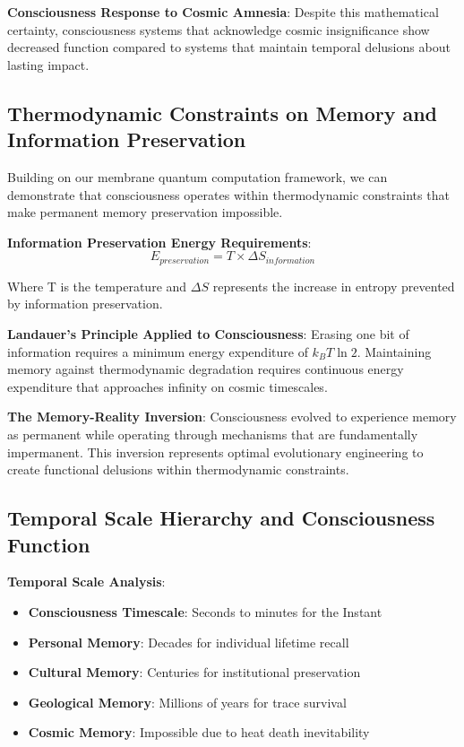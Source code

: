 \documentclass[12pt]{article}
\begin{document}
\textbf{Consciousness Response to Cosmic Amnesia}: Despite this mathematical certainty, consciousness systems that acknowledge cosmic insignificance show decreased function compared to systems that maintain temporal delusions about lasting impact.

\subsection{Thermodynamic Constraints on Memory and Information Preservation}

Building on our membrane quantum computation framework, we can demonstrate that consciousness operates within thermodynamic constraints that make permanent memory preservation impossible.

\textbf{Information Preservation Energy Requirements}:
$$E_{preservation} = T \times \Delta S_{information}$$

Where T is the temperature and $\Delta S$ represents the increase in entropy prevented by information preservation.

\textbf{Landauer's Principle Applied to Consciousness}: Erasing one bit of information requires a minimum energy expenditure of $k_B T \ln 2$. Maintaining memory against thermodynamic degradation requires continuous energy expenditure that approaches infinity on cosmic timescales.

\textbf{The Memory-Reality Inversion}: Consciousness evolved to experience memory as permanent while operating through mechanisms that are fundamentally impermanent. This inversion represents optimal evolutionary engineering to create functional delusions within thermodynamic constraints.

\subsection{Temporal Scale Hierarchy and Consciousness Function}

\textbf{Temporal Scale Analysis}:
\begin{itemize}
\item \textbf{Consciousness Timescale}: Seconds to minutes for the Instant
\item \textbf{Personal Memory}: Decades for individual lifetime recall
\item \textbf{Cultural Memory}: Centuries for institutional preservation
\item \textbf{Geological Memory}: Millions of years for trace survival
\item \textbf{Cosmic Memory}: Impossible due to heat death inevitability
\end{itemize}
\end{document}

